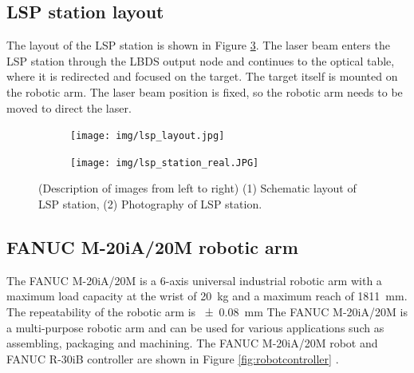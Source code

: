 \subsection{LSP station layout}

The layout of the LSP station is shown in Figure \ref{fig:lsplayout}. The laser beam enters the LSP station through the LBDS output node and
continues to the optical table, where it is redirected and
focused on the target. The target itself is mounted on the
robotic arm. The laser beam position is fixed, so the robotic
arm needs to be moved to direct the laser.

\begin{figure}[t!]
\centering
\begin{subfigure}{.45\textwidth}

    \texttt{[image: img/lsp\_layout.jpg]}

    \label{fig:a}
\end{subfigure}
\begin{subfigure}{.45\textwidth}

    \texttt{[image: img/lsp\_station\_real.JPG]}

    \label{fig:b}
\end{subfigure}

\caption{(Description of images from left to right) (1) Schematic layout of LSP station, (2) Photography of LSP station.}
\label{fig:lsplayout}
\end{figure}

\subsection{FANUC M-20iA/20M robotic arm}

The FANUC M-20iA/20M is a 6-axis universal industrial robotic arm with a maximum load capacity at the wrist of \SI{20}{\kg} and a maximum reach of \SI{1811}{\mm}. The repeatability of the robotic arm is \SI{+-0.08}{\mm} The FANUC M-20iA/20M is a multi-purpose robotic arm and can be used for various applications such as assembling, packaging and machining. The  FANUC M-20iA/20M robot and FANUC R-30iB controller are shown in Figure \ref{fig:robotcontroller} \cite{fanucrobot}.


